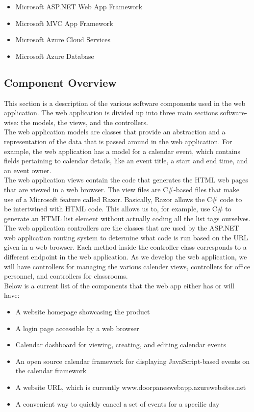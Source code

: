 \begin{itemize}
\item Microsoft ASP.NET Web App Framework
\item Microsoft MVC App Framework
\item Microsoft Azure Cloud Services
\item Microsoft Azure Database
\end{itemize}


\subsection{Component  Overview}
This section is a description of the various software components used in the web application. The web application is divided up into three main sections software-wise: the models, the views, and the controllers.\\

The web application models are classes that provide an abstraction and a representation of the data that is passed around in the web application. For example, the web application has a model for a calendar event, which contains fields pertaining to calendar details, like an event title, a start and end time, and an event owner.\\

The web application views contain the code that generates the HTML web pages that are viewed in a web browser. The view files are C\#-based files that make use of a Microsoft feature called Razor. Basically, Razor allows the C\# code to be intertwined with HTML code. This allows us to, for example, use C\# to generate an HTML list element without actually coding all the list tags ourselves.\\

The web application controllers are the classes that are used by the ASP.NET web application routing system to determine what code is run based on the URL given in a web browser. Each method inside the controller class corresponds to a different endpoint in the web application. As we develop the web application, we will have controllers for managing the various calender views, controllers for office personnel, and controllers for classrooms.\\

Below is a current list of the components that the web app either has or will have:


\begin{itemize}
\item A website homepage showcasing the product 
\item A login page accessible by a web browser
\item Calendar dashboard for viewing, creating, and editing calendar events
\item An open source calendar framework for displaying JavaScript-based events on the calendar framework
\item A website URL, which is currently www.doorpaneswebapp.azurewebsites.net
\item A convenient way to quickly cancel a set of events for a specific day
\end{itemize}


